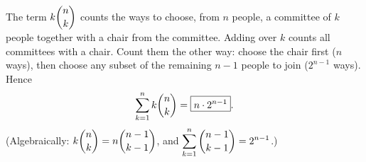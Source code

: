 The term $k\dbinom nk$ counts the ways to choose, from $n$ people, a committee of $k$ people together with a chair from the committee. Adding over $k$ counts all committees with a chair. Count them the other way: choose the chair first ($n$ ways), then choose any subset of the remaining $n-1$ people to join ($2^{n-1}$ ways). Hence
\[\sum_{k=1}^{n}k\dbinom nk=\boxed{n\cdot2^{n-1}}.\]
(Algebraically: $k\dbinom nk=n\dbinom{n-1}{k-1}$, and $\displaystyle\sum_{k=1}^{n}\dbinom{n-1}{k-1}=2^{n-1}$.)
